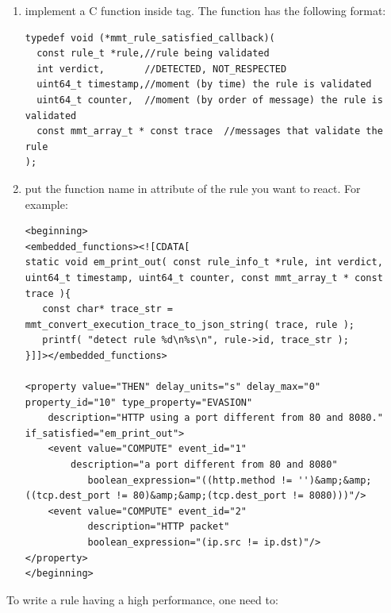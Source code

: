 \begin{enumerate}
    \item 
implement a C function inside  tag.
The function has the following format:

\begin{lstlisting}[style=Cpp]
typedef void (*mmt_rule_satisfied_callback)(
  const rule_t *rule,//rule being validated
  int verdict,       //DETECTED, NOT_RESPECTED
  uint64_t timestamp,//moment (by time) the rule is validated
  uint64_t counter,  //moment (by order of message) the rule is validated
  const mmt_array_t * const trace  //messages that validate the rule
);
\end{lstlisting}

\item put the function name in attribute  of the rule you want to react. For example: 

\begin{lstlisting}[style=Cpp]
<beginning>
<embedded_functions><![CDATA[
static void em_print_out( const rule_info_t *rule, int verdict, uint64_t timestamp, uint64_t counter, const mmt_array_t * const trace ){
   const char* trace_str = mmt_convert_execution_trace_to_json_string( trace, rule );
   printf( "detect rule %d\n%s\n", rule->id, trace_str );
}]]></embedded_functions>

<property value="THEN" delay_units="s" delay_max="0" property_id="10" type_property="EVASION" 
    description="HTTP using a port different from 80 and 8080." if_satisfied="em_print_out">
    <event value="COMPUTE" event_id="1" 
        description="a port different from 80 and 8080"
           boolean_expression="((http.method != '')&amp;&amp;((tcp.dest_port != 80)&amp;&amp;(tcp.dest_port != 8080)))"/>
    <event value="COMPUTE" event_id="2" 
           description="HTTP packet"
           boolean_expression="(ip.src != ip.dst)"/>
</property>
</beginning>
\end{lstlisting}

\end{enumerate}

To write a rule having a high performance, one need to:

